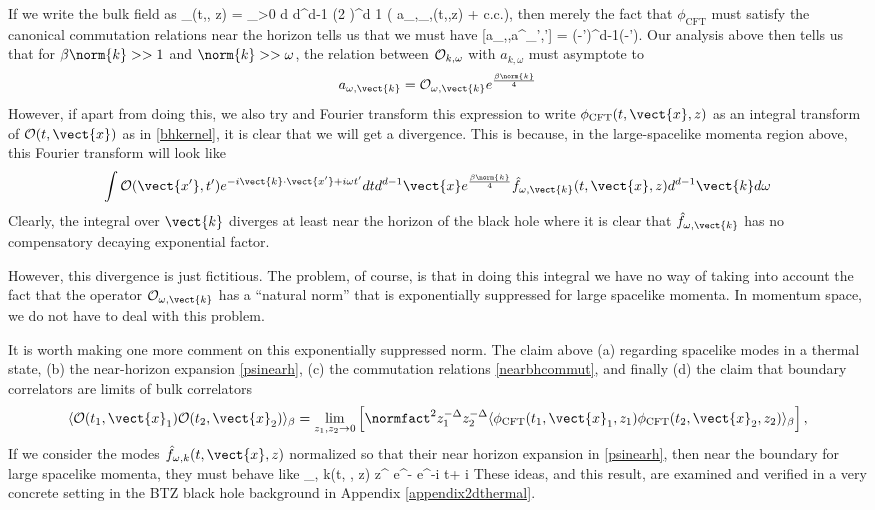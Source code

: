 If we write the bulk field as
\be
\label{nearbhop}
\phi_{}(t,, z) = \int_{\omega>0} {d \omega  d^{d-1} \over (2 \pi)^d}   {1 \over \sqrt{2\omega}}
\left( a_{\omega,}_{\omega,}(t,,z) + {\rm c.c.}\right),
\ee
then merely the fact that $\phi_{\text{CFT}}$ must satisfy the canonical commutation relations near the horizon tells us that we must have
\be
\label{nearbhcommut}
[a_{\omega,},a^\dagger_{\omega','}] = \delta(\omega-\omega')\delta^{d-1}(-').
\ee
Our analysis above then tells us that for $\beta \norm{k} >> 1$ and $\norm{k} >> \omega$, the relation between  ${\cal O}_{k, \omega}$ with $a_{k, \omega}$ must asymptote to
\[
a_{\omega, \vect{k}} = {\cal O}_{\omega,\vect{k}} e^{\beta \norm{k} \over 4}
 \]
However, if apart from doing this, we also try and Fourier transform this
expression to write $\phi_{\text{CFT}}(t,\vect{x},z)$ as an integral transform of ${\cal O}(t, \vect{x})$ as in \eqref{bhkernel}, it is clear that we will get a divergence. This is because, in the large-spacelike momenta region above, this Fourier transform
will look like
\[
 \int {\cal O}(\vect{x'},t') e^{-i \vect{k} \cdot \vect{x'} + i \omega t'} d t d^{d-1} \vect{x}  e^{\beta \norm{k} \over 4} \hat{f}_{\omega, \vect{k}}(t,\vect{x},z) d^{d -1} \vect{k} d \omega
 \]
Clearly, the integral over $\vect{k}$ diverges at least near the horizon of the black hole where it is clear that $\hat{f}_{\omega, \vect{k}}$ has no compensatory decaying exponential factor. 

However, this divergence is just fictitious.  The problem, of course, is that in doing this integral we have no way of taking into account the fact that the operator ${\cal O}_{\omega, \vect{k}}$ has a ``natural norm'' that is exponentially suppressed for large spacelike momenta. In momentum space, we do not have to deal with this problem.

It is worth making one more comment on this exponentially suppressed norm. The claim above (a) regarding spacelike modes in a thermal state, (b) the near-horizon expansion \eqref{psinearh}, (c) the commutation relations \eqref{nearbhcommut}, and finally (d) the claim that boundary correlators are limits of bulk correlators
\[
\langle {\cal O}(t_1, \vect{x}_1) {\cal O}(t_2, \vect{x}_2) \rangle_\beta =   \lim_{z_1, z_2 \rightarrow 0}\left[\normfact^2 z_1^{-\Delta} z_2^{-\Delta} \langle \phi_{\text{CFT}}(t_1,\vect{x}_1, z_1)   \phi_{\text{CFT}}(t_2,\vect{x}_2, z_2)\rangle_\beta\right],
 \]
If we consider the modes $\hat{f}_{\omega, k}(t, \vect{x}, z)$ normalized so that their near horizon expansion in \eqref{psinearh}, then near the boundary for large spacelike momenta, they must behave like
\be
{}_{\omega, k}(t, , z)  z^{\Delta} e^{-{\beta {} }} e^{-i \omega t+ i  \cdot {}}
 \ee
These ideas, and this result, are examined and verified in a very concrete setting in the BTZ black hole background in Appendix \ref{appendix2dthermal}. 











